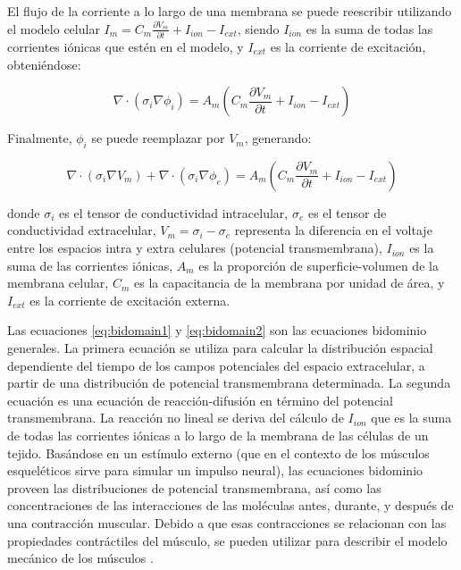 El flujo de la corriente a lo largo de una membrana se puede reescribir utilizando el modelo celular $I_m = C_m \frac{\partial V_m}{\partial t} + I_{ion} - I_{ext}$, siendo $I_{ion}$ es la suma de todas las corrientes iónicas que estén en el modelo, y $I_{ext}$ es la corriente de excitación, obteniéndose:

\begin{equation}
	\nabla \cdot (\sigma_i \nabla \phi_i) = A_m (C_m \frac{\partial V_m}{\partial t} + I_{ion} - I_{ext})
\end{equation}

Finalmente, $\phi_i$ se puede reemplazar por $V_m$, generando:

\begin{equation}
\label{eq:bidomain2}
	\nabla \cdot (\sigma_i \nabla V_m) + \nabla \cdot (\sigma_i \nabla \phi_e) = A_m (C_m \frac{\partial V_m}{\partial t} + I_{ion} - I_{ext})
\end{equation}

donde $\sigma_i$ es el tensor de conductividad intracelular,  $\sigma_e$ es el tensor de conductividad extracelular, $V_m = \sigma_i - \sigma_e$ representa la diferencia en el voltaje entre los espacios intra y extra celulares (potencial transmembrana), $I_{ion}$ es la suma de las corrientes iónicas, $A_m$ es la proporción de superficie-volumen de la membrana celular, $C_m$ es la capacitancia de la membrana por unidad de área, y $I_{ext}$ es la corriente de excitación externa.

Las ecuaciones \ref{eq:bidomain1} y \ref{eq:bidomain2} son las ecuaciones bidominio generales. La primera ecuación se utiliza para calcular la distribución espacial dependiente del tiempo de los campos potenciales del espacio extracelular, a partir de una distribución de potencial transmembrana determinada. La segunda ecuación es una ecuación de reacción-difusión en término del potencial transmembrana. La reacción no lineal se deriva del cálculo de $I_{ion}$ que es la suma de todas las corrientes iónicas a lo largo de la membrana de las células de un tejido. Basándose en un estímulo externo (que en el contexto de los músculos esqueléticos sirve para simular un impulso neural), las ecuaciones bidominio proveen las distribuciones de potencial transmembrana, así como las concentraciones de las interacciones de las moléculas antes, durante, y después de una contracción muscular. Debido a que esas contracciones se relacionan con las propiedades contráctiles del músculo, se pueden utilizar para describir el modelo mecánico de los músculos \citep{rohrle2010simulating}.


